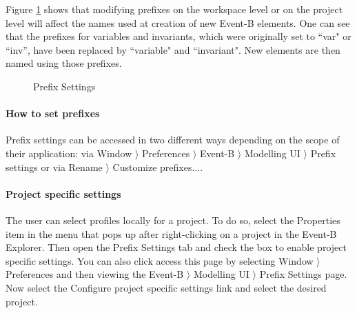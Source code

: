 Figure \ref{fig_ref_01_preferences1} shows that modifying prefixes on the workspace level or on the project level will affect the names used at creation of new Event-B elements. One can see that the prefixes for variables and invariants, which were originally set to ``var" or ``inv'', have been replaced by ``variable" and ``invariant". New elements are then named using those prefixes.

\ifinprint
\begin{figure}
  \begin{center}
    \caption{Prefix Settings}
    \label{fig_ref_01_preferences1}
  \end{center}
\end{figure}
\else
{}
\fi


\paragraph{How to set prefixes}

Prefix settings can be accessed in two different ways depending on the scope of their application: via \textsf{Window $\rangle$ Preferences $\rangle$ Event-B $\rangle$ Modelling UI $\rangle$ Prefix settings} or via \textsf{Rename $\rangle$ Customize prefixes...}.

\paragraph{Project specific settings}

The user can select profiles locally for a project. To do so, select the \textsf{Properties} item in the menu that pops up after right-clicking on a project in the \textsf{Event-B Explorer}. Then open the \textsf{Prefix Settings} tab and check the box to enable project specific settings. You can also click access this page by selecting \textsf{Window $\rangle$ Preferences} and then viewing the \textsf{Event-B $\rangle$ Modelling UI $\rangle$ Prefix Settings} page. Now select the \textsf{Configure project specific settings} link and select the desired project. 

